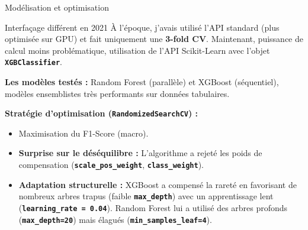 \documentclass[aspectratio=169, 10pt]{beamer}
\newcommand{\mytexttt}[1]{\texttt{\textbf{\textcolor{colortt}{#1}}}}
\begin{document}
\begin{frame}{Modélisation et optimisation}

    \begin{alertblock}{Interfaçage différent en 2021}
À l'époque, j'avais utilisé l'API standard (plus optimisée sur GPU) et fait uniquement une \textbf{3-fold CV}. Maintenant, puissance de calcul moins problématique, utilisation de l'API Scikit-Learn avec l'objet \mytexttt{XGBClassifier}.
    \end{alertblock}
    \vspace{0.3cm}
    
    \pause
    \textbf{Les modèles testés :} Random Forest (parallèle) et XGBoost (séquentiel), modèles ensemblistes très performants sur données tabulaires.
    
    \pause
    \vspace{0.1cm}
    \textbf{Stratégie d'optimisation (\mytexttt{RandomizedSearchCV}) :}
    \begin{itemize}
        \item Maximisation du F1-Score (macro).
    \pause
        \item \textbf{Surprise sur le déséquilibre :} L'algorithme a rejeté les poids de compensation (\mytexttt{scale\_pos\_weight}, \mytexttt{class\_weight}).
    \pause
        \item \textbf{Adaptation structurelle :} XGBoost a compensé la rareté en favorisant de nombreux arbres trapus (faible \mytexttt{max\_depth}) avec un apprentissage lent (\mytexttt{learning\_rate = 0.04}). Random Forest lui a utilisé des arbres profonds (\mytexttt{max\_depth=20}) mais élagués (\mytexttt{min\_samples\_leaf=4}).
    \end{itemize}
\end{frame}
\end{document}
